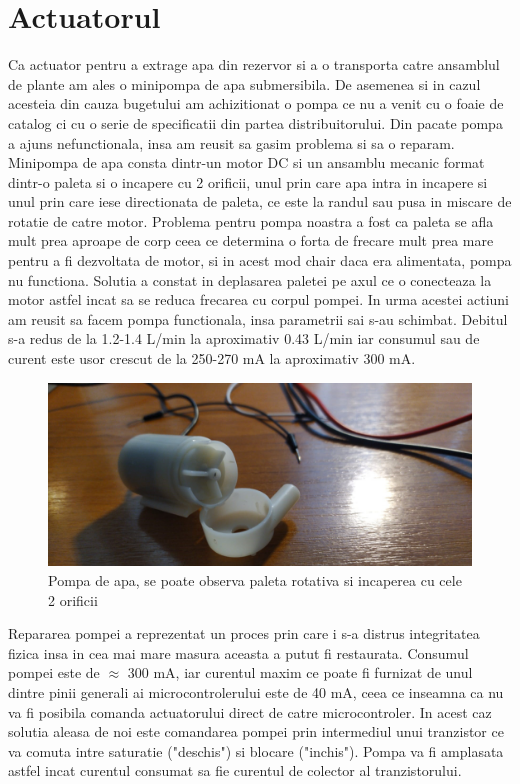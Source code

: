 \documentclass[12pt]{article}
\begin{document}
\section{Actuatorul}
\hspace{8 mm} Ca actuator pentru a extrage apa din rezervor si a o transporta catre ansamblul de plante am ales o minipompa de apa submersibila. De asemenea si in cazul acesteia din cauza bugetului am achizitionat o pompa ce nu a venit cu o foaie de catalog ci cu o serie de specificatii din partea distribuitorului. Din pacate pompa a ajuns nefunctionala, insa am reusit sa gasim problema si sa o reparam. Minipompa de apa consta dintr-un motor DC si un ansamblu mecanic format dintr-o paleta si o incapere cu 2 orificii, unul prin care apa intra in incapere si unul prin care iese directionata de paleta, ce este la randul sau pusa in miscare de rotatie de catre motor. Problema pentru pompa noastra a fost ca paleta se afla mult prea aproape de corp ceea ce determina o forta de frecare mult prea mare pentru a fi dezvoltata de motor, si in acest mod chair daca era alimentata, pompa nu functiona. Solutia a constat in deplasarea paletei pe axul ce o conecteaza la motor astfel incat sa se reduca frecarea cu corpul pompei. In urma acestei actiuni am reusit sa facem pompa functionala, insa parametrii sai s-au schimbat. Debitul s-a redus de la 1.2-1.4 L/min la aproximativ 0.43 L/min iar consumul sau de curent este usor crescut de la 250-270 mA la aproximativ 300 mA.


\begin{figure}[H]
\centering
\includegraphics[width=\textwidth]{Pictures/pompa.jpeg}
\caption{Pompa de apa, se poate observa paleta rotativa si incaperea cu cele 2 orificii}
\end{figure}

Repararea pompei a reprezentat un proces prin care i s-a distrus integritatea fizica insa in cea mai mare masura aceasta a putut fi restaurata. Consumul pompei este de $\approx$ 300 mA, iar curentul maxim ce poate fi furnizat de unul dintre pinii generali ai microcontrolerului este de 40 mA, ceea ce inseamna ca nu va fi posibila comanda actuatorului direct de catre microcontroler. In acest caz solutia aleasa de noi este comandarea pompei prin intermediul unui tranzistor ce va comuta intre saturatie ("deschis") si blocare ("inchis"). Pompa va fi amplasata astfel incat curentul consumat sa fie curentul de colector al tranzistorului.
\end{document}
